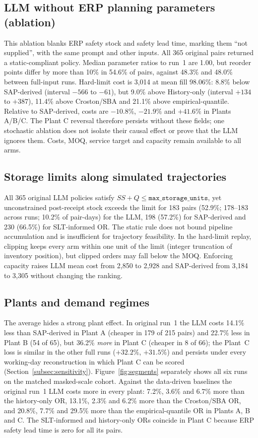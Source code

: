 \documentclass[preprint,12pt,nonatbib]{elsarticle}
\begin{document}
\subsection{LLM without ERP planning parameters (ablation)}
\label{subsec:ablation}
This ablation blanks ERP safety stock and safety lead time, marking them ``not supplied'', with the same prompt and other inputs. All 365 original pairs returned a static-compliant policy. Median parameter ratios to run~1 are 1.00, but reorder points differ by more than 10\% in 54.6\% of pairs, against 48.3\% and 48.0\% between full-input runs. Hard-limit cost is 3{,}014 at mean fill 98.06\%: 8.8\% below SAP-derived (interval $-566$ to $-61$), but 9.0\% above History-only (interval $+134$ to $+387$), 11.4\% above Croston/SBA and 21.1\% above empirical-quantile. Relative to SAP-derived, costs are $-10.8\%$, $-21.9\%$ and $+41.6\%$ in Plants A/B/C. The Plant C reversal therefore persists without these fields; one stochastic ablation does not isolate their causal effect or prove that the LLM ignores them. Costs, MOQ, service target and capacity remain available to all arms.

\subsection{Storage limits along simulated trajectories}
\label{subsec:capacity}
All 365 original LLM policies satisfy $SS+Q\le\texttt{max\_storage\_units}$, yet unconstrained post-receipt stock exceeds the limit for 183 pairs (52.9\%; 178--183 across runs; 10.2\% of pair-days) for the LLM, 198 (57.2\%) for SAP-derived and 230 (66.5\%) for SLT-informed OR. The static rule does not bound pipeline accumulation and is insufficient for trajectory feasibility. In the hard-limit replay, clipping keeps every arm within one unit of the limit (integer truncation of inventory position), but clipped orders may fall below the MOQ. Enforcing capacity raises LLM mean cost from 2{,}850 to 2{,}928 and SAP-derived from 3{,}184 to 3{,}305 without changing the ranking.

\subsection{Plants and demand regimes}
\label{subsec:plants}
The average hides a strong plant effect. In original run~1 the LLM costs 14.1\% less than SAP-derived in Plant A (cheaper in 179 of 215 pairs) and 22.7\% less in Plant B (54 of 65), but 36.2\% \emph{more} in Plant C (cheaper in 8 of 66); the Plant~C loss is similar in the other full runs ($+32.2\%$, $+31.5\%$) and persists under every working-day reconstruction in which Plant C can be scored (Section~\ref{subsec:sensitivity}). Figure~\ref{fig:segments} separately shows all six runs on the matched masked-scale cohort. Against the data-driven baselines the original run~1 LLM costs more in every plant: 7.2\%, 3.6\% and 6.7\% more than the history-only OR, 13.1\%, 2.3\% and 6.2\% more than the Croston/SBA OR, and 20.8\%, 7.7\% and 29.5\% more than the empirical-quantile OR in Plants A, B and C. The SLT-informed and history-only ORs coincide in Plant C because ERP safety lead time is zero for all its pairs.
\end{document}
